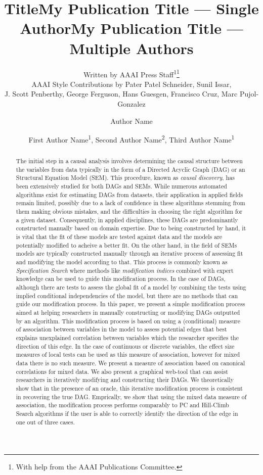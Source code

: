 \documentclass[letterpaper]{article} %
\title{Title}
\author{
    Written by AAAI Press Staff\textsuperscript{\rm 1}\thanks{With help from the AAAI Publications Committee.}\\
    AAAI Style Contributions by Pater Patel Schneider,
    Sunil Issar,\\
    J. Scott Penberthy,
    George Ferguson,
    Hans Guesgen,
    Francisco Cruz\equalcontrib,
    Marc Pujol-Gonzalez\equalcontrib
}
\title{My Publication Title --- Single Author}
\author {
    Author Name
}
\title{My Publication Title --- Multiple Authors}
\author {
    First Author Name\textsuperscript{\rm 1},
    Second Author Name\textsuperscript{\rm 2},
    Third Author Name\textsuperscript{\rm 1}
}
\begin{document}
\maketitle

\begin{abstract}
	The initial step in a causal analysis involves determining the causal
	structure between the variables from data typically in the form of a
	Directed Acyclic Graph (DAG) or an Structural Equation Model (SEM).
	This procedure, known as \emph{causal discovery}, has been extensively
	studied for both DAGs and SEMs. While numerous automated algorithms
	exist for estimating DAGs from datasets, their application in applied
	fields remain limited, possibly due to a lack of confidence in these
	algorithms stemming from them making obvious mistakes, and the
	difficulties in choosing the right algorithm for a given dataset.
	Consequently, in applied disciplines, these DAGs are predominantly
	constructed manually based on domain expertise. Due to being
	constructed by hand, it is vital that the fit of these models are
	tested against data and the models are potentially modified to acheive
	a better fit. On the other hand, in the field of SEMs models are
	typically constructed manually through an iterative process of
	assessing fit and modifying the model according to that. This process
	is commonly known as \emph{Specification Search} where methods like
	\emph{modification indices} combined with expert knowledge can be used
	to guide this modification process. In the case of DAGs, although there
	are tests to assess the global fit of a model by combining the tests
	using implied conditional independencies of the model, but there are no
	methods that can guide our modification process. In this paper, we
	present a simple modification process aimed at helping researchers in
	manually constructing or modifying DAGs outputted by an algorithm. This
	modification process is based on using a (conditional) measure of
	association between variables in the model to assess potential edges
	that best explains unexplained correlation between variables which the
	researcher specifies the direction of this edge. In the case of
	continuous or discrete variables, the effect size measures of local
	tests can be used as this measure of association, however for mixed
	data there is no such measure. We present a measure of association
	based on canonical correlations for mixed data. We also present a
	graphical web-tool that can assist researchers in iteratively modifying
	and constructing their DAGs. We theoretically show that in the presence
	of an oracle, this iterative modification process is consistent in
	recovering the true DAG. Emprically, we show that using the mixed data
	measure of association, the modification process performs comparably to
	PC and Hill-Climb Search algorithms if the user is able to correctly
	identify the direction of the edge in one out of three cases.
\end{abstract}
\end{document}
